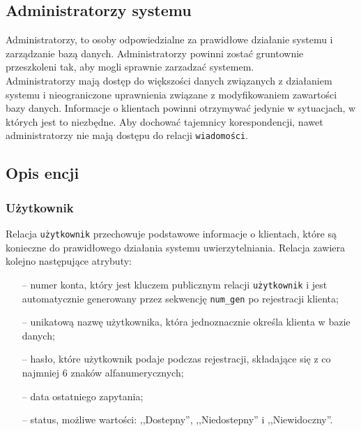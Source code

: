 \documentclass[a4paper,12pt]{article}
\begin{document}
\subsection[Administratorzy systemu]{Administratorzy systemu}
Administratorzy, to osoby odpowiedzialne za prawidłowe działanie systemu i zarządzanie bazą danych.
Administratorzy powinni zostać gruntownie przeszkoleni tak, aby mogli sprawnie
zarzadzać systemem.\\
Administratorzy mają dostęp do większości danych związanych z działaniem systemu i nieograniczone uprawnienia związane
z modyfikowaniem zawartości bazy danych.
Informacje o klientach powinni otrzymywać jedynie w sytuacjach, w których
jest to niezbędne. Aby dochować tajemnicy korespondencji, nawet administratorzy nie mają dostępu do relacji \texttt{wiadomości}.

\subsection[Opis encji]{Opis encji}
\subsubsection[Użytkownik]{Użytkownik}
Relacja \texttt{użytkownik} przechowuje podstawowe informacje o klientach, które są konieczne do prawidłowego działania systemu uwierzytelniania. Relacja zawiera kolejno następujące atrybuty:
\begin{itemize}
    \item[--] numer konta, który jest kluczem publicznym relacji \texttt{użytkownik} i jest automatycznie generowany przez sekwencję \texttt{num\_gen} po rejestracji klienta;
    \item[--] unikatową nazwę użytkownika, która jednoznacznie określa klienta w bazie danych;
    \item[--] hasło, które użytkownik podaje podczas rejestracji, składające się z co najmniej 6 znaków alfanumerycznych;
    \item[--] data ostatniego zapytania;
    \item[--] status, możliwe wartości: ,,Dostepny'', ,,Niedostepny'' i ,,Niewidoczny''.
\end{itemize}
\end{document}
